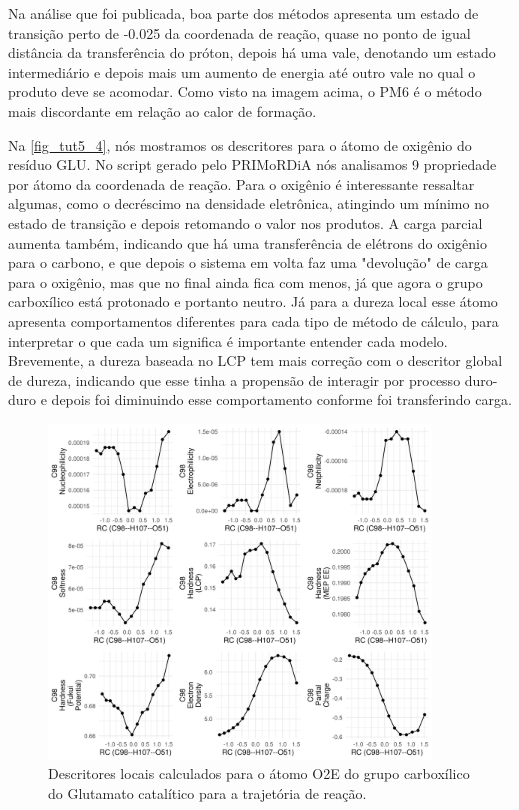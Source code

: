 \documentclass[a4paper,11pt]{refart}
\begin{document}
Na análise que foi publicada, boa parte dos métodos apresenta um estado de transição perto de -0.025 da coordenada de reação, quase no ponto de igual distância da transferência do próton, depois há uma vale, denotando um estado intermediário e depois mais um aumento de energia até outro vale no qual o produto deve se acomodar. Como visto na imagem acima, o PM6 é o método mais discordante em relação ao calor de formação. 

Na \autoref{fig_tut5_4}, nós mostramos os descritores para o átomo de oxigênio do resíduo GLU. No script gerado pelo PRIMoRDiA nós analisamos 9 propriedade por átomo da coordenada de reação. Para o oxigênio é interessante ressaltar algumas, como o decréscimo na densidade eletrônica, atingindo um mínimo no estado de transição e depois retomando o valor nos produtos. A carga parcial aumenta também, indicando que há uma transferência de elétrons do oxigênio para o carbono, e que depois o sistema em volta faz uma "devolução" de carga para o oxigênio, mas que no final ainda fica com menos, já que agora o grupo carboxílico está protonado e portanto neutro. Já para a dureza local esse átomo apresenta comportamentos diferentes para cada tipo de método de cálculo, para interpretar o que cada um significa é importante entender cada modelo. Brevemente, a dureza baseada no LCP tem mais correção com o descritor global de dureza, indicando que esse tinha a propensão de interagir por processo duro-duro e depois foi diminuindo esse comportamento conforme foi transferindo carga. 

\hspace*{-\leftmarginwidth}
\begin{minipage}{\fullwidth}
	\begin{figure}[H]
		\begin{center}
			\includegraphics[width=4in]{images/tut6_img4}
			\caption{Descritores locais calculados para o átomo O2E do grupo carboxílico do Glutamato catalítico para a trajetória de reação.}
			\label{fig_tut5_4}
		\end{center}
	\end{figure}
\end{minipage}
\end{document}
